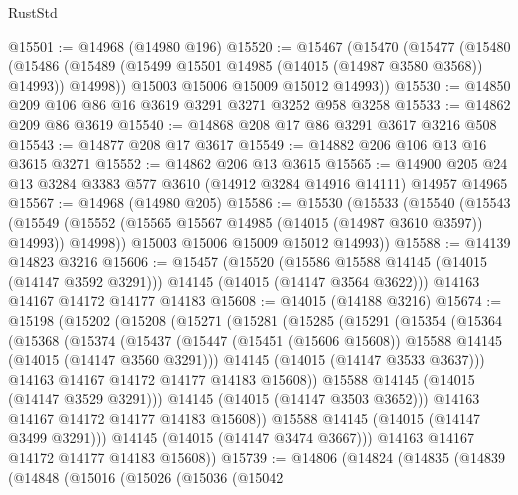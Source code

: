 \begin{lexlean}{RustStd}
\begin{coremodule}
@15501 := @14968 (@14980 @196)
@15520 := @15467
    (@15470
      (@15477
        (@15480
          (@15486 (@15489 (@15499 @15501 @14985 (@14015 (@14987 @3580 @3568)) @14993)) @14998))
        @15003
        @15006
        @15009
        @15012
        @14993))
@15530 := @14850 @209 @106 @86 @16 @3619 @3291 @3271 @3252 @958 @3258
@15533 := @14862 @209 @86 @3619
@15540 := @14868 @208 @17 @86 @3291 @3617 @3216 @508
@15543 := @14877 @208 @17 @3617
@15549 := @14882 @206 @106 @13 @16 @3615 @3271
@15552 := @14862 @206 @13 @3615
@15565 := @14900 @205 @24 @13 @3284 @3383 @577 @3610 (@14912 @3284 @14916 @14111) @14957 @14965
@15567 := @14968 (@14980 @205)
@15586 := @15530
    (@15533
      (@15540
        (@15543
          (@15549 (@15552 (@15565 @15567 @14985 (@14015 (@14987 @3610 @3597)) @14993)) @14998))
        @15003
        @15006
        @15009
        @15012
        @14993))
@15588 := @14139 @14823 @3216
@15606 := @15457
    (@15520
      (@15586 @15588 @14145 (@14015 (@14147 @3592 @3291)))
      @14145
      (@14015 (@14147 @3564 @3622)))
    @14163
    @14167
    @14172
    @14177
    @14183
@15608 := @14015 (@14188 @3216)
@15674 := @15198
    (@15202
      (@15208
        (@15271
          (@15281
            (@15285
              (@15291
                (@15354
                  (@15364
                    (@15368
                      (@15374
                        (@15437
                          (@15447
                            (@15451 (@15606 @15608))
                            @15588
                            @14145
                            (@14015 (@14147 @3560 @3291)))
                          @14145
                          (@14015 (@14147 @3533 @3637)))
                        @14163
                        @14167
                        @14172
                        @14177
                        @14183
                        @15608))
                    @15588
                    @14145
                    (@14015 (@14147 @3529 @3291)))
                  @14145
                  (@14015 (@14147 @3503 @3652)))
                @14163
                @14167
                @14172
                @14177
                @14183
                @15608))
            @15588
            @14145
            (@14015 (@14147 @3499 @3291)))
          @14145
          (@14015 (@14147 @3474 @3667)))
        @14163
        @14167
        @14172
        @14177
        @14183
        @15608))
@15739 := @14806
    (@14824
      (@14835
        (@14839
          (@14848
            (@15016
              (@15026
                (@15036
                  (@15042

\end{coremodule}
\end{lexlean}
